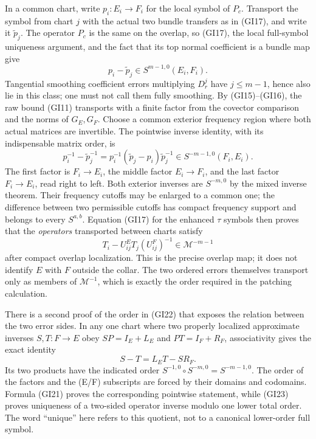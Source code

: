 \documentclass[
  11pt,
]{article}
\begin{document}
In a common chart, write \(p_i:E_i\to F_i\) for the local symbol of
\(P_c\). Transport the symbol from chart \(j\) with the actual two
bundle transfers as in (GI17), and write it \(\widetilde p_j\). The
operator \(P_c\) is the same on the overlap, so (GI17), the local
full-symbol uniqueness argument, and the fact that its top normal
coefficient is a bundle map give \[
 p_i-\widetilde p_j\in S^{m-1,0}(E_i,F_i).
 \tag{GI20}
\] Tangential smoothing coefficient errors multiplying \(D_r^j\) have
\(j\leq m-1\), hence also lie in this class; one must not call them
fully smoothing. By (GI15)--(GI16), the raw bound (GI11) transports with
a finite factor from the covector comparison and the norms of
\(G_E,G_F\). Choose a common exterior frequency region where both actual
matrices are invertible. The pointwise inverse identity, with its
indispensable matrix order, is \[
 p_i^{-1}-\widetilde p_j^{-1}
 =p_i^{-1}(\widetilde p_j-p_i)\widetilde p_j^{-1}
 \in S^{-m-1,0}(F_i,E_i).
 \tag{GI21}
\] The first factor is \(F_i\to E_i\), the middle factor \(E_i\to F_i\),
and the last factor \(F_i\to E_i\), read right to left. Both exterior
inverses are \(S^{-m,0}\) by the mixed inverse theorem. Their frequency
cutoffs may be enlarged to a common one; the difference between two
permissible cutoffs has compact frequency support and belongs to every
\(S^{a,b}\). Equation (GI17) for the enhanced \ensuremath{\tau} symbols then proves that
the \emph{operators} transported between charts satisfy \[
 T_i-U^E_{ij}T_j(U^F_{ij})^{-1}
 \in\mathscr M^{-m-1}
 \tag{GI22}
\] after compact overlap localization. This is the precise overlap map;
it does not identify \(E\) with \(F\) outside the collar. The two
ordered errors themselves transport only as members of
\(\mathscr M^{-1}\), which is exactly the order required in the patching
calculation.

There is a second proof of the order in (GI22) that exposes the relation
between the two error sides. In any one chart where two properly
localized approximate inverses \(S,T:F\to E\) obey \(SP=I_E+L_E\) and
\(PT=I_F+R_F\), associativity gives the exact identity \[
 S-T=L_ET-SR_F.
 \tag{GI23}
\] Its two products have the indicated order
\(S^{-1,0}\circ S^{-m,0}=S^{-m-1,0}\). The order of the factors and the
(E/F) subscripts are forced by their domains and codomains. Formula
(GI21) proves the corresponding pointwise statement, while (GI23) proves
uniqueness of a two-sided operator inverse modulo one lower total order.
The word ``unique'' here refers to this quotient, not to a canonical
lower-order full symbol.
\end{document}
